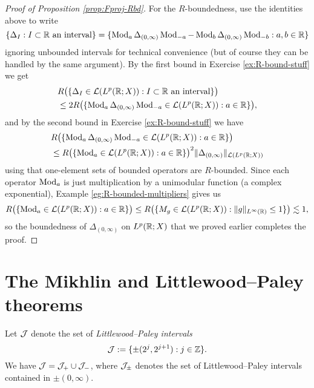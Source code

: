 \begin{proof}[Proof of Proposition \ref{prop:Fproj-Rbd}]
  For the $R$-boundedness, use the identities above to write
  \begin{equation*}
    \{\Delta_{I} : \text{$I \subset \mathbb{R}$ an interval}\}
    = \{\operatorname{Mod}_{a} \Delta_{(0,\infty)} \operatorname{Mod}_{-a} - \operatorname{Mod}_{b} \Delta_{(0,\infty)} \operatorname{Mod}_{-b} : a,b \in \mathbb{R}\} 
  \end{equation*}
  ignoring unbounded intervals for technical convenience (but of course they can be handled by the same argument).
  By the first bound in Exercise \eqref{ex:R-bound-stuff} we get
  \begin{equation*}
    \begin{aligned}
      &R\big( \{\Delta_{I} \in \mathcal{L}(L^p(\mathbb{R};X)) : \text{$I \subset \mathbb{R}$ an interval}\} \big) \\
      &\leq 2R\big( \{\operatorname{Mod}_{a} \Delta_{(0,\infty)} \operatorname{Mod}_{-a} \in \mathcal{L}(L^p(\mathbb{R};X)) : a \in \mathbb{R}\}  \big),
  \end{aligned}
  \end{equation*}
  and by the second bound in Exercise \eqref{ex:R-bound-stuff} we have
  \begin{equation*}
    \begin{aligned}
      &R\big( \{\operatorname{Mod}_{a} \Delta_{(0,\infty)} \operatorname{Mod}_{-a} \in \mathcal{L}(L^p(\mathbb{R};X)) : a \in \mathbb{R}\}  \big) \\
      &\leq R\big( \{ \operatorname{Mod}_{a} \in \mathcal{L}(L^p(\mathbb{R};X)) : a \in \mathbb{R} \} \big)^{2} \|\Delta_{(0,\infty)}\|_{\mathcal{L}(L^p(\mathbb{R};X))}
    \end{aligned}
  \end{equation*}
  using that one-element sets of bounded operators are $R$-bounded.
  Since each operator $\operatorname{Mod}_{a}$ is just multiplication by a unimodular function (a complex exponential), Example \eqref{eg:R-bounded-multipliers} gives us
  \begin{equation*}
    R\big( \{ \operatorname{Mod}_{a} \in \mathcal{L}(L^p(\mathbb{R};X)) : a \in \mathbb{R} \} \big)
    \leq R\big( \{ M_{g} \in \mathcal{L}(L^p(\mathbb{R};X))  : \|g\|_{L^\infty(\mathbb{R})} \leq 1\} \big) \lesssim 1,
\end{equation*}
so the boundedness of $\Delta_{(0,\infty)}$ on $L^p(\mathbb{R};X)$ that we proved earlier completes the proof.
\end{proof}


\section{The Mikhlin and Littlewood--Paley theorems}


Let $\mathcal{J}$ denote the set of \emph{Littlewood--Paley intervals}
\begin{equation*}
  \mathcal{J} := \{\pm(2^{j}, 2^{j+1}) : j \in \mathbb{Z}\}.
\end{equation*}
We have $\mathcal{J} = \mathcal{J}_{+} \cup \mathcal{J}_{-}$, where $\mathcal{J}_{\pm}$ denotes the set of Littlewood--Paley intervals contained in $\pm(0,\infty)$.

